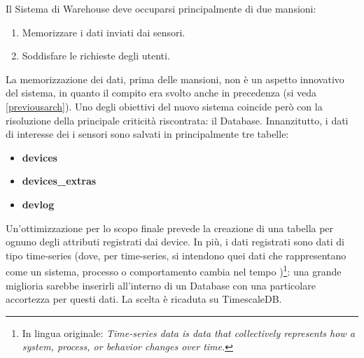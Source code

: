 Il Sistema di Warehouse deve occuparsi principalmente di due mansioni:
\begin{enumerate}
    \item Memorizzare i dati inviati dai sensori.
    \item Soddisfare le richieste degli utenti.
\end{enumerate}
La memorizzazione dei dati, prima delle mansioni, non è un aspetto innovativo del sistema, in quanto il compito era svolto anche in precedenza (si veda \ref{previousarch}). Uno degli obiettivi del nuovo sistema coincide però con la risoluzione della principale criticità riscontrata: il Database. Innanzitutto, i dati di interesse dei i sensori sono salvati in principalmente tre tabelle: 
\begin{itemize}
    \item \textbf{devices}
    \item \textbf{devices\_extras}
    \item \textbf{devlog}
\end{itemize}
Un'ottimizzazione per lo scopo finale prevede la creazione di una tabella per ognuno degli attributi registrati dai device. In più, i dati registrati sono dati di tipo time-series (dove, per time-series, si intendono quei dati che rappresentano come un sistema, processo o comportamento cambia nel tempo \cite{timescaledb})\footnote{In lingua originale: \textit{Time-series data is data that collectively represents how a system, process, or behavior changes over time.} }: una grande miglioria sarebbe inserirli all'interno di un Database con una particolare accortezza per questi dati. La scelta è ricaduta su TimescaleDB.
